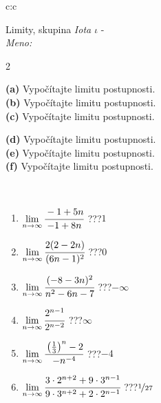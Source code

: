 \documentclass[10pt]{report}
\begin{document}
\newpage
\thispagestyle{empty}
\begin{tabular}{c:c}
\begin{minipage}[c][104.5mm][t]{0.5\linewidth}
\begin{center}
\vspace{5mm}
{\huge Limity, skupina \textit{Iota $\iota$} -}\\[5mm]
\textit{Meno:}\phantom{xxxxxxxxxxxxxxxxxxxxxxxxxxxxxxxxxxxxxxxxxxxxxxxxxxxxxxxxxxxxxxxxx}\\[5mm]
\begin{minipage}{0.95\linewidth}
\begin{center}
{\small \begin{multicols}{2} \raggedright
\textbf{(a)} Vypočítajte limitu postupnosti. \\[1mm]
\textbf{(b)} Vypočítajte limitu postupnosti. \\[1mm]
\textbf{(c)} Vypočítajte limitu postupnosti. \par \columnbreak
\textbf{(d)} Vypočítajte limitu postupnosti. \\[1mm]
\textbf{(e)} Vypočítajte limitu postupnosti. \\[1mm]
\textbf{(f)} Vypočítajte limitu postupnosti.
\end{multicols}
}
\end{center}
\end{minipage}
\\[1mm]
\begin{minipage}{0.79\linewidth}
\begin{center}
\begin{varwidth}{\linewidth}
\setlength{\itemsep}{0pt}
\begin{enumerate}
\footnotesizerr
\item $\lim\limits_{n\to\infty}\cfrac{-1+5n}{-1+8n}$\quad \dotfill\; ???\;\dotfill \quad $1$
\item $\lim\limits_{n\to\infty}\cfrac{2(2-2n)}{(6n-1)^2}$\quad \dotfill\; ???\;\dotfill \quad $0$
\item $\lim\limits_{n\to\infty}\cfrac{(-8-3n)^2}{n^2-6n-7}$\quad \dotfill\; ???\;\dotfill \quad $-\infty$
\item $\lim\limits_{n\to\infty}\cfrac{2^{n-1}}{2^{n-2}}$\quad \dotfill\; ???\;\dotfill \quad $\infty$
\item $\lim\limits_{n\to\infty}\cfrac{\left(\frac{1}{3}\right)^n -2}{-n^{-4}}$\quad \dotfill\; ???\;\dotfill \quad $-4$
\item $\lim\limits_{n\to\infty}\cfrac{3\cdot 2^{n+2}+9\cdot 3^{n-1}}{9\cdot 3^{n+2}+2\cdot 2^{n-1}}$\quad \dotfill\; ???\;\dotfill \quad $\nicefrac{1}{27}$

\end{enumerate}
\end{varwidth}
\end{center}
\end{minipage}
\end{center}
\end{minipage}
\end{tabular}
\end{document}

